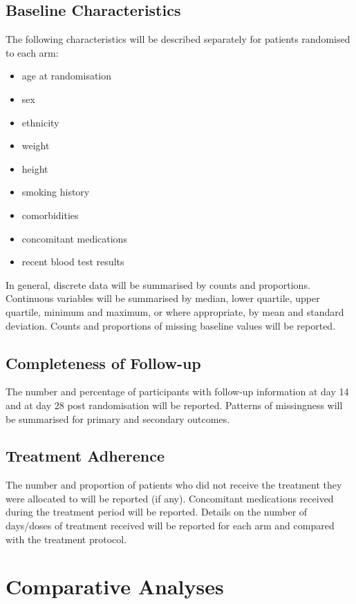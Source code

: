 \documentclass[11pt,parskip=half-]{scrartcl}
\begin{document}
\subsection{Baseline Characteristics}
The following characteristics will be described separately for patients randomised to each arm:
\begin{itemize}
    \item age at randomisation
    \item sex
    \item ethnicity
    \item weight
    \item height
    \item smoking history
    \item comorbidities
    \item concomitant medications
    \item recent blood test results
\end{itemize}
In general, discrete data will be summarised by counts and proportions. Continuous variables will be summarised by median, lower quartile, upper quartile, minimum and maximum, or where appropriate, by mean and standard deviation. Counts and proportions of missing baseline values will be reported.

\subsection{Completeness of Follow-up}
The number and percentage of participants with follow-up information at day 14 and at day 28 post randomisation will be reported. Patterns of missingness will be summarised for primary and secondary outcomes.

\subsection{Treatment Adherence}
The number and proportion of patients who did not receive the treatment they were allocated to will be reported (if any). Concomitant medications received during the treatment period will be reported. Details on the number of days/doses of treatment received will be reported for each arm and compared with the treatment protocol.

\clearpage

\section{Comparative Analyses}
\end{document}
